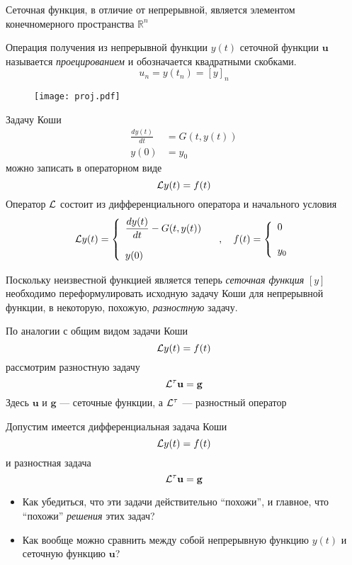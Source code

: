 \documentclass[professionalfonts,compress,unicode]{beamer}
\begin{document}
{
	Сеточная функция, в отличие от непрерывной, является элементом конечномерного пространства $\mathbb{R}^n$
	
	Операция получения из непрерывной функции $y(t)$ сеточной функции $\mathbf{u}$ 
	называется \emph{проецированием} и обозначается квадратными скобками.
	$$
	u_n = y(t_n) = [y]_n
	$$
	\begin{figure}%
	\texttt{[image: proj.pdf]}%
	\end{figure}
}

{
	Задачу Коши
	\begin{align*}
	\frac{dy(t)}{dt} &= G(t, y(t))\\
	y(0) &= y_0
	\end{align*}	
	можно записать в операторном виде
	$$
	\mathcal{L} y(t) = f(t)
	$$
	Оператор $\mathcal{L}$ состоит из дифференциального оператора и начального условия
	$$
	\mathcal{L} y(t) = \left\{
	\begin{array}{l}
		\displaystyle \frac{dy(t)}{dt} - G(t, y(t))\\
		\\
		y(0)
	\end{array}
	\right.
	\quad,\quad
	f(t) = \left\{
	\begin{array}{l}
		0\\
		\\
		y_0
	\end{array}
	\right.	
	$$
}

\def\Lh{{\L^{\tau}}}
{
	Поскольку неизвестной функцией является теперь \emph{сеточная функция} $[y]$ необходимо переформулировать исходную задачу 
	Коши для непрерывной функции, в некоторую, похожую, \emph{разностную} задачу.
	\pause

	По аналогии с общим видом задачи Коши
	$$
	\mathcal{L} y(t) = f(t)
	$$
	рассмотрим разностную задачу
	$$
	\Lh \mathbf{u} = \mathbf{g}
	$$
	Здесь $\mathbf{u}$ и $\mathbf{g}$ --- сеточные функции, а $\Lh$ --- разностный оператор
}

{
	Допустим имеется дифференциальная задача Коши
	$$
	\mathcal{L} y(t) = f(t)
	$$
	и разностная задача
	$$
	\Lh \mathbf{u} = \mathbf{g}
	$$
	\begin{itemize}
	\item Как убедиться, что эти задачи действительно ``похожи'', и главное, что ``похожи'' \emph{решения} этих задач?
	\pause
	
	\item Как вообще можно сравнить между собой непрерывную функцию $y(t)$ и сеточную функцию $\mathbf{u}$?
	\end{itemize}
}
\end{document}
